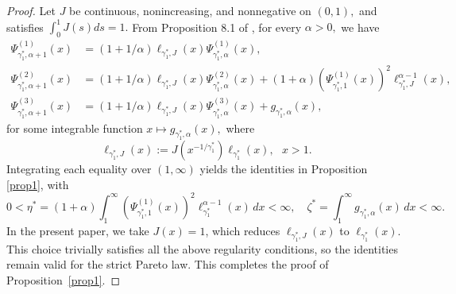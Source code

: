 \documentclass[reqno,openbib,runningheads,a4paper,12pt]{amsart}%
\begin{document}
\begin{proof}
Let $J$ be continuous, nonincreasing, and nonnegative on $\left(  0,1\right)
,$ and satisfies $\int_{0}^{1}J\left(  s\right)  ds=1.$ From Proposition 8.1
of \cite{MNM2025}, for every $\alpha>0,$ we have
\begin{align*}
\Psi_{\gamma_{1}^{\ast},\alpha+1}^{(1)}(x)  &  =(1+1/\alpha)\ell_{\gamma
_{1}^{\ast},J}(x)\Psi_{\gamma_{1}^{\ast},\alpha}^{(1)}(x),\\
\Psi_{\gamma_{1}^{\ast},\alpha+1}^{(2)}(x)  &  =(1+1/\alpha)\ell_{\gamma
_{1}^{\ast},J}(x)\Psi_{\gamma_{1}^{\ast},\alpha}^{(2)}(x)+(1+\alpha)\left(
\Psi_{\gamma_{1}^{\ast},1}^{(1)}(x)\right)  ^{2}\ell_{\gamma_{1}^{\ast}%
,J}^{\alpha-1}(x),\\
\Psi_{\gamma_{1}^{\ast},\alpha+1}^{(3)}(x)  &  =(1+1/\alpha)\ell_{\gamma
_{1}^{\ast},J}(x)\Psi_{\gamma_{1}^{\ast},\alpha}^{(3)}(x)+g_{\gamma_{1}^{\ast
},\alpha}(x),
\end{align*}
for some integrable function $x\mapsto g_{\gamma_{1}^{\ast},\alpha}(x),$
where
\[
\ell_{\gamma_{1}^{\ast},J}(x):=J(x^{-1/\gamma_{1}^{\ast}})\ell_{\gamma
_{1}^{\ast}}(x),\text{ }x>1.
\]
Integrating each equality over $(1,\infty)$ yields the identities in
Proposition \ref{prop1}, with
\[
0<\eta^{\ast}=(1+\alpha)\int_{1}^{\infty}\left(  \Psi_{\gamma_{1}^{\ast}%
,1}^{(1)}(x)\right)  ^{2}\ell_{\gamma_{1}^{\ast}}^{\alpha-1}(x)\,dx<\infty
,\quad\zeta^{\ast}=\int_{1}^{\infty}g_{\gamma_{1}^{\ast},\alpha}%
(x)\,dx<\infty.
\]
In the present paper, we take $J(x)=1$, which reduces $\ell_{\gamma_{1}^{\ast
},J}(x)$ to $\ell_{\gamma_{1}^{\ast}}(x).$ This choice trivially satisfies all
the above regularity conditions, so the identities remain valid for the strict
Pareto law. This completes the proof of Proposition~\ref{prop1}.
\end{proof}
\end{document}

